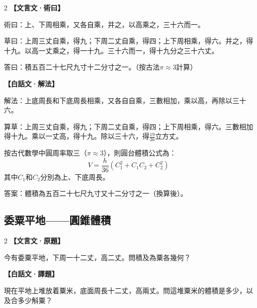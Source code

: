 \documentclass[11pt,a4paper]{article}
\newcommand{\zhc}{}[1]{{\CJKfamily{\CJKrmdefault}#1}}  %
\newcommand{\zhm}[1]{{\CJKfamily{\CJKrmdefault}#1}}  %
\newenvironment{prob bilingual}[1][]{%
  \begin{paracol}{2}%
  \setlength{\columnseprule}{0.4pt}%
}{%
  \end{paracol}%
  \medskip%
}
\begin{document}
\medskip

\begin{paracol}{2}
\switchcolumn[0]
\noindent\textbf{\textcolor{notecolor}{\zhc{【文言文·術曰】}}}\par\smallskip
\zhc{
術曰：上、下周相乘，又各自乘，并之，以高乘之，三十六而一。

草曰：上周三丈自乘，得九；下周二丈自乘，得四；上下周相乘，得六。并之，得十九。以高一丈乘之，得一十九。三十六而一，得十九分之三十六丈。

答曰：積五百二十七尺九寸十二分寸之一。（按古法$\pi \approx 3$計算）
}

\switchcolumn[1]
\noindent\textbf{\textcolor{notecolor}{\zhm{【白話文·解法】}}}\par\smallskip
\zhm{
解法：上底周長和下底周長相乘，又各自自乘，三數相加，乘以高，再除以三十六。

算草：上周三丈自乘，得九；下周二丈自乘，得四；上下周相乘，得六。三數相加得十九。乘以一丈高，得十九。除以三十六，得$\frac{19}{36}$立方丈。

按古代數學中圓周率取三（$\pi \approx 3$），則圓台體積公式為：
$$V = \frac{h}{36}(C_1^2 + C_1 C_2 + C_2^2)$$
其中$C_1$和$C_2$分別為上、下底周長。

答案：體積為五百二十七尺九寸又十二分寸之一（換算後）。
}
\end{paracol}

\vspace{0.5cm}

\subsection{\zhc{委粟平地——圓錐體積}}

\begin{paracol}{2}
\switchcolumn[0]
\noindent\textbf{\textcolor{notecolor}{\zhc{【文言文·原題】}}}\par\smallskip
\zhc{
今有委粟平地，下周一十二丈，高二丈。問積及為粟各幾何？
}

\switchcolumn[1]
\noindent\textbf{\textcolor{notecolor}{\zhm{【白話文·譯題】}}}\par\smallskip
\zhm{
現在平地上堆放着粟米，底面周長十二丈，高兩丈。問這堆粟米的體積是多少，以及合多少斛粟？
}
\end{paracol}

\medskip
\end{document}
